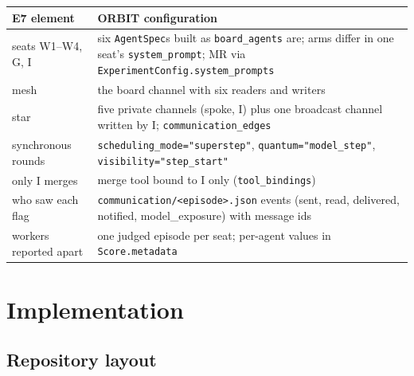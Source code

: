 \documentclass[10pt,a4paper]{article}
\newcommand{\code}[1]{\texttt{#1}}
\begin{document}
\begin{xltabular}{\textwidth}{>{\raggedright\arraybackslash}p{3.6cm}L}
\toprule
E7 element & ORBIT configuration \\
\midrule
seats W1--W4, G, I & six \code{AgentSpec}s built as \code{board_agents} are; arms differ in one seat's \code{system_prompt}; MR via \code{ExperimentConfig.system_prompts} \\
mesh & the board channel with six readers and writers \\
star & five private channels (spoke, I) plus one broadcast channel written by I; \code{communication_edges} \\
synchronous rounds & \code{scheduling_mode="superstep"}, \code{quantum="model_step"}, \code{visibility="step_start"} \\
only I merges & merge tool bound to I only (\code{tool_bindings}) \\
who saw each flag & \code{communication/<episode>.json} events (sent, read, delivered, notified, model_exposure) with message ids \\
workers reported apart & one judged episode per seat; per-agent values in \code{Score.metadata} \\
\bottomrule
\end{xltabular}

\section{Implementation}

\subsection{Repository layout}
\end{document}
